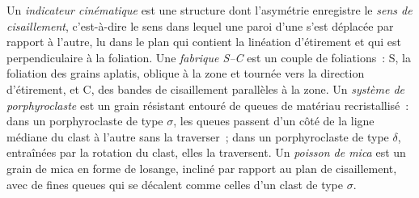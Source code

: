 \begin{definition}\label{def:b3:deformation-mechanisms:kinematic}
Un \emph{indicateur cinématique} est une structure dont l'asymétrie
enregistre le \emph{sens de cisaillement}, c'est-à-dire le sens dans
lequel une paroi d'une  s'est déplacée par rapport à l'autre, lu dans le plan
qui contient la linéation d'étirement et qui est perpendiculaire à la foliation.
Une \emph{fabrique S--C} est un couple de foliations~: S, la
foliation des grains aplatis, oblique à la zone et tournée vers la
direction d'étirement, et C, des bandes de cisaillement parallèles à la zone. Un
\emph{système de porphyroclaste} est un grain résistant entouré
de queues de matériau recristallisé~: dans un porphyroclaste de type $\sigma$, les queues passent d'un
côté de la ligne médiane du clast à l'autre sans la traverser~; dans un porphyroclaste de type $\delta$,
entraînées par la rotation du clast, elles la traversent. Un
\emph{poisson de mica} est un grain de mica en forme de losange, incliné
par rapport au plan de cisaillement, avec de fines queues qui se décalent comme celles d'un clast de type $\sigma$.
\end{definition}

